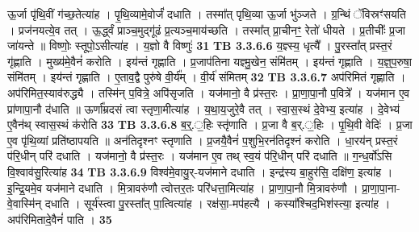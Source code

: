 \documentclass[17pt]{extarticle}
\begin{document}
{{{{{{{{{{{{{{{{{{{                  ऊ॒र्जा पृ॑थि॒वीं ग॑च्छ॒तेत्या॑ह । पृ॒थि॒व्यामे॒वोर्जं॑ दधाति । तस्मा᳚त् पृथि॒व्या ऊ॒र्जा भु॑ञ्जते । ग्र॒न्थिं ॅविस्रꣳ॑सयति । प्रज॑नयत्ये॒व तत् । ऊ॒र्द्ध्वं प्राञ्च॒मुद्गू॑ढं प्र॒त्यञ्च॒माय॑च्छति । तस्मा᳚त् प्रा॒चीनꣳ॒॒ रेतो॑ धीयते । प्र॒तीचीः᳚ प्र॒जा जा॑यन्ते ॥ विष्णोः॒ स्तूपो॒ऽसीत्या॑ह । य॒ज्ञो वै विष्णुः॑ \textbf{ 31} \newline
                  \newline
                                \textbf{ TB 3.3.6.6} \newline
                  य॒ज्ञ्स्य॒ धृत्यै᳚ । पु॒रस्ता᳚त् प्रस्त॒रं गृ॑ह्णाति । मुख्य॑मे॒वैनं॑ करोति । इय॑न्तं गृह्णाति । प्र॒जाप॑तिना यज्ञ्मु॒खेन॒ संमि॑तम् । इय॑न्तं गृह्णाति । य॒ज्ञ्॒प॒रुषा॒ संमि॑तम् । इय॑न्तं गृह्णाति । ए॒ताव॒द्वै पुरु॑षे वी॒र्य᳚म् । वी॒र्य॑ संमितम् \textbf{ 32} \newline
                  \newline
                                \textbf{ TB 3.3.6.7} \newline
                  अप॑रिमितं गृह्णाति । अप॑रिमित॒स्याव॑रुद्ध्यै । तस्मि॑न् प॒वित्रे॒ अपि॑सृजति । यज॑मानो॒ वै प्र॑स्त॒रः । प्रा॒णा॒पा॒नौ प॒वित्रे᳚ । यज॑मान ए॒व प्रा॑णापा॒नौ द॑धाति ॥ ऊर्णा᳚म्रदसं त्वा स्तृणा॒मीत्या॑ह । य॒था॒य॒जुरे॒वै तत् । स्वा॒स॒स्थं दे॒वेभ्य॒ इत्या॑ह । दे॒वेभ्य॑ ए॒वैन॑थ् स्वास॒स्थं क॑रोति \textbf{ 33} \newline
                  \newline
                                \textbf{ TB 3.3.6.8} \newline
                  ब॒र्॒.॒हिः स्तृ॑णाति । प्र॒जा वै ब॒र्.॒हिः । पृ॒थि॒वी वेदिः॑ । प्र॒जा ए॒व पृ॑थि॒व्यां प्रति॑ष्ठापयति ॥ अन॑तिदृश्नꣳ स्तृणाति । प्र॒जयै॒वैनं॑ प॒शुभि॒रन॑तिदृश्नं करोति । धा॒रय॑न् प्रस्त॒रं प॑रि॒धीन् परि॑ दधाति । यज॑मानो॒ वै प्र॑स्त॒रः । यज॑मान ए॒व तथ् स्व॒यं प॑रि॒धीन् परि॑ दधाति ॥ ग॒न्ध॒र्वो॑ऽसि वि॒श्वाव॑सु॒रित्या॑ह \textbf{ 34} \newline
                  \newline
                                \textbf{ TB 3.3.6.9} \newline
                  विश्व॑मे॒वायु॒र्-यज॑माने दधाति । इन्द्र॑स्य बा॒हुर॑सि॒ दक्षि॑ण॒ इत्या॑ह । इ॒न्द्रि॒यमे॒व यज॑माने दधाति । मि॒त्रावरु॑णौ त्वोत्तर॒तः परि॑धत्ता॒मित्या॑ह । प्रा॒णा॒पा॒नौ मि॒त्रावरु॑णौ । प्रा॒णा॒पा॒ना-वे॒वास्मि॑न् दधाति । सूर्य॑स्त्वा पु॒रस्ता᳚त् पा॒त्वित्या॑ह । रक्ष॑सा॒-मप॑हत्यै । कस्या᳚श्चिद॒भिश॑स्त्या॒ इत्या॑ह । अप॑रिमितादे॒वैनं॑ पाति । \textbf{ 35} \newline
                  \newline
}}}}}}}}}}}}}}}}}}}
\end{document}
